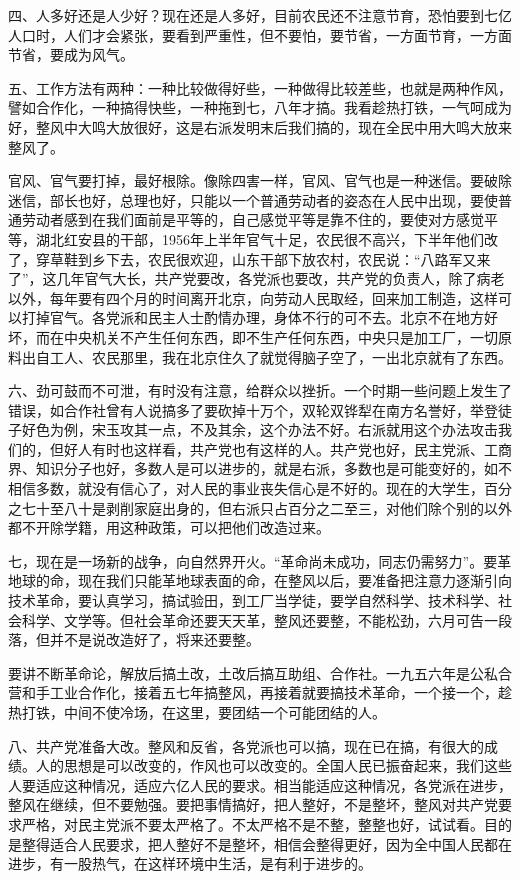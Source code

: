 四、人多好还是人少好？现在还是人多好，目前农民还不注意节育，恐怕要到七亿人口时，人们才会紧张，要看到严重性，但不要怕，要节省，一方面节育，一方面节省，要成为风气。

五、工作方法有两种：一种比较做得好些，一种做得比较差些，也就是两种作风，譬如合作化，一种搞得快些，一种拖到七，八年才搞。我看趁热打铁，一气呵成为好，整风中大鸣大放很好，这是右派发明末后我们搞的，现在全民中用大鸣大放来整风了。

官风、官气要打掉，最好根除。像除四害一样，官风、官气也是一种迷信。要破除迷信，部长也好，总理也好，只能以一个普通劳动者的姿态在人民中出现，要使普通劳动者感到在我们面前是平等的，自己感觉平等是靠不住的，要使对方感觉平等，湖北红安县的干部，1956年上半年官气十足，农民很不高兴，下半年他们改了，穿草鞋到乡下去，农民很欢迎，山东干部下放农村，农民说：“八路军又来了”，这几年官气大长，共产党要改，各党派也要改，共产党的负责人，除了病老以外，每年要有四个月的时间离开北京，向劳动人民取经，回来加工制造，这样可以打掉官气。各党派和民主人士酌情办理，身体不行的可不去。北京不在地方好坏，而在中央机关不产生任何东西，即不生产任何东西，中央只是加工厂，一切原料出自工人、农民那里，我在北京住久了就觉得脑子空了，一出北京就有了东西。

六、劲可鼓而不可泄，有时没有注意，给群众以挫折。一个时期一些问题上发生了错误，如合作社曾有人说搞多了要砍掉十万个，双轮双铧犁在南方名誉好，举登徒子好色为例，宋玉攻其一点，不及其余，这个办法不好。右派就用这个办法攻击我们的，但好人有时也这样看，共产党也有这样的人。共产党也好，民主党派、工商界、知识分子也好，多数人是可以进步的，就是右派，多数也是可能变好的，如不相信多数，就没有信心了，对人民的事业丧失信心是不好的。现在的大学生，百分之七十至八十是剥削家庭出身的，但右派只占百分之二至三，对他们除个别的以外都不开除学籍，用这种政策，可以把他们改造过来。

七，现在是一场新的战争，向自然界开火。“革命尚未成功，同志仍需努力”。要革地球的命，现在我们只能革地球表面的命，在整风以后，要准备把注意力逐渐引向技术革命，要认真学习，搞试验田，到工厂当学徒，要学自然科学、技术科学、社会科学、文学等。但社会革命还要天天革，整风还要整，不能松劲，六月可告一段落，但并不是说改造好了，将来还要整。

要讲不断革命论，解放后搞土改，土改后搞互助组、合作社。一九五六年是公私合营和手工业合作化，接着五七年搞整风，再接着就要搞技术革命，一个接一个，趁热打铁，中间不使冷场，在这里，要团结一个可能团结的人。

八、共产党准备大改。整风和反省，各党派也可以搞，现在已在搞，有很大的成绩。人的思想是可以改变的，作风也可以改变的。全国人民已振奋起来，我们这些人要适应这种情况，适应六亿人民的要求。相当能适应这种情况，各党派在进步，整风在继续，但不要勉强。要把事情搞好，把人整好，不是整坏，整风对共产党要求严格，对民主党派不要太严格了。不太严格不是不整，整整也好，试试看。目的是整得适合人民要求，把人整好不是整坏，相信会整得更好，因为全中国人民都在进步，有一股热气，在这样环境中生活，是有利于进步的。

